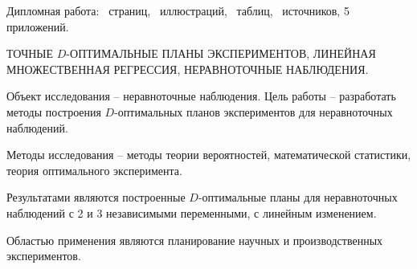 Дипломная работа: \ страниц, \totalfigures{}~иллюстраций, \totaltables{}\ таблиц,
\ источников, 5 приложений.

\vspace{\baselineskip}

ТОЧНЫЕ $D$-ОПТИМАЛЬНЫЕ ПЛАНЫ ЭКСПЕРИМЕНТОВ, ЛИНЕЙНАЯ МНОЖЕСТВЕННАЯ РЕГРЕССИЯ, НЕРАВНОТОЧНЫЕ НАБЛЮДЕНИЯ.

\vspace{\baselineskip}

Объект исследования – неравноточные наблюдения. Цель работы – разработать методы построения $D$-оптимальных планов экспериментов для неравноточных наблюдений.

Методы исследования – методы теории вероятностей, математической
статистики, теория оптимального эксперимента.

Результатами являются построенные $D$-оптимальные планы для неравноточных наблюдений с 2 и 3 независимыми переменными, с линейным изменением.

Областью применения являются планирование научных и производственных экспериментов.
